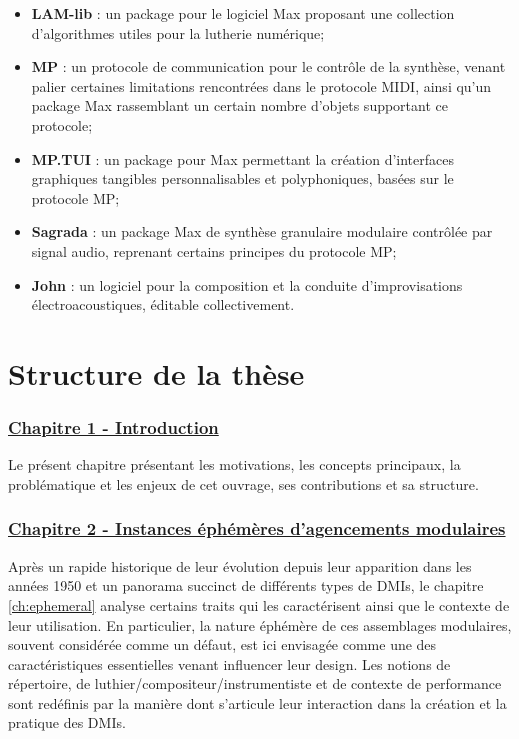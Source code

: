\begin{itemize}[noitemsep]
\item \textbf{LAM-lib} : un package pour le logiciel Max proposant une collection d'algorithmes utiles pour la lutherie numérique;
\item \textbf{MP} : un protocole de communication pour le contrôle de la synthèse, venant palier certaines limitations rencontrées dans le protocole MIDI, ainsi qu'un package Max rassemblant un certain nombre d'objets supportant ce protocole;
\item \textbf{MP.TUI} : un package pour Max permettant la création d'interfaces graphiques tangibles personnalisables et polyphoniques, basées sur le protocole MP;
\item \textbf{Sagrada} : un package Max de synthèse granulaire modulaire contrôlée par signal audio, reprenant certains principes du protocole MP;
\item \textbf{John} : un logiciel pour la composition et la conduite d'improvisations électroacoustiques, éditable collectivement.
\end{itemize}


\section{Structure de la thèse}
\label{sec:preamble:structure}

\subsubsection*{\hyperref[ch:introduction]{Chapitre 1 - Introduction}} 
\noindent Le présent chapitre présentant les motivations, les concepts principaux, la problématique et les enjeux de cet ouvrage, ses contributions et sa structure.

\subsubsection*{\hyperref[ch:ephemeral]{Chapitre 2 - Instances éphémères d'agencements modulaires}}

\noindent Après un rapide historique de leur évolution depuis leur apparition dans les années 1950 et un panorama succinct de différents types de \glspl{DMI}, le chapitre \ref{ch:ephemeral} analyse certains traits qui les caractérisent ainsi que le contexte de leur utilisation. En particulier, la nature éphémère de ces assemblages modulaires, souvent considérée comme un défaut, est ici envisagée comme une des caractéristiques essentielles venant influencer leur design. Les notions de répertoire, de luthier/compositeur/instrumentiste et de contexte de performance sont redéfinis par la manière dont s'articule leur interaction dans la création et la pratique des \glspl{DMI}.

